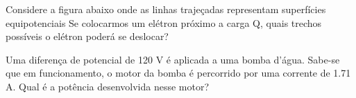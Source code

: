 \documentclass[12pt, addpoints]{exam}
\begin{document}
\begin{questions}
\begin{multicols*}{2}
\begin{oneparchoices}
\end{oneparchoices}
\question[20] Considere a figura abaixo onde as linhas trajeçadas representam superfícies equipotenciais Se colocarmos um elétron próximo a carga Q, quais trechos possíveis o elétron poderá se deslocar?
        
        \begin{center}
            \begin{minipage}[c]{0.5\linewidth}
            \end{minipage}
        \end{center}
        
        

\begin{oneparchoices}
\end{oneparchoices}
\question[20] Uma diferença de potencial de 120 V é aplicada a uma bomba d’água. Sabe-se que em funcionamento, o motor da bomba é percorrido por uma corrente de    1.71 A. Qual é a potência desenvolvida nesse motor?


\end{multicols*}
\end{questions}
\end{document}
